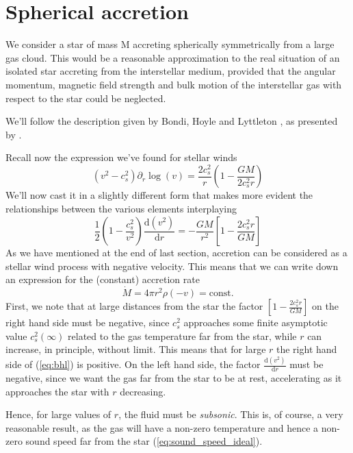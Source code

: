 \section{Spherical accretion}
We consider a star of mass M accreting spherically symmetrically from a large gas cloud. This would be a reasonable approximation to the real situation of an isolated star accreting from the interstellar medium, provided that the angular momentum, magnetic field strength and bulk motion of the interstellar gas with respect to the star could be neglected.
\par We'll follow the description given by Bondi, Hoyle and Lyttleton \cite{1939PCPS...35..592H}, \cite{1944MNRAS.104..273B} as presented by \cite{Frank_King_Raine_2002}.
\par Recall now the expression we've found for stellar winds 
\begin{equation*}
     (v^{2}-c_{s}^{2})\partial_{r}\log(v) = \frac{2c_{s}^{2}}{r}\left(1-\frac{GM}{2c_{s}^{2}r}\right)
\end{equation*}
We'll now cast it in a slightly different form that makes more evident the relationships between the various elements interplaying
\begin{equation}
    \frac{1}{2}\left(1-\frac{c_{s}^{2}}{v^{2}}\right)\frac{\text{d}(v^{2})}{\text{d}r} = -\frac{GM}{r^{2}}\left[1-\frac{2c_{s}^{2}r}{GM}\right]
    \label{eq:bhl}
\end{equation}
As we have mentioned at the end of last section, accretion can be considered as a stellar wind process with negative velocity. This means that we can write down an expression for the (constant) accretion rate 
\begin{equation*}
    \dot{M} = 4\pi r^{2}\rho (-v) = \text{const.}
\end{equation*}
First, we note that at large distances from the star the factor $\left[1-\frac{2c_{s}^{2}r}{GM}\right]$ on the right hand side must be negative, since $c_{s}^{2}$ approaches some finite asymptotic value $c_{s}^{2}(\infty)$ related to the gas temperature far from the star, while $r$ can increase, in principle, without limit. This means that for large $r$ the right hand side of (\ref{eq:bhl}) is positive. On the left hand side, the factor $\frac{\text{d}(v^{2})}{\text{d}r}$ must be negative, since we want the gas far from the star to be at rest, accelerating as it approaches the star with $r$ decreasing.
\par Hence, for large values of $r$, the fluid must be \emph{subsonic}. This is, of course, a very reasonable result, as the gas will have a non-zero temperature and hence a non-zero sound speed far from the star (\ref{eq:sound_speed_ideal}).
